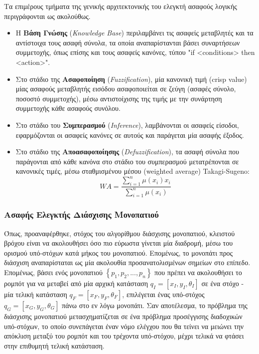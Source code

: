 \bigskip\noindent
Τα επιμέρους τμήματα της γενικής αρχιτεκτονικής του ελεγκτή ασαφούς λογικής περιγράφονται ως ακολούθως.
\begin{itemize}
	\item Η \textbf{Βάση Γνώσης} (\textit{Knowledge Base}) περιλαμβάνει τις ασαφείς μεταβλητές και τα αντίστοιχα τους ασαφή σύνολα, τα οποία αναπαρίστανται βάσει συναρτήσεων συμμετοχής, όπως επίσης και τους ασαφείς κανόνες, τύπου "if <conditions> then <action>".
	\item Στο στάδιο της \textbf{Aσαφοποίηση} (\textit{Fuzzification}), μία κανονική τιμή (crisp value) μίας ασαφούς μεταβλητής εισόδου ασαφοποιείται σε ζεύγη (ασαφές σύνολο, ποσοστό συμμετοχής), μέσω αντιστοίχισης της τιμής με την συνάρτηση συμμετοχής κάθε ασαφούς συνόλου.
	\item Στο στάδιο του \textbf{Συμπερασμού} (\textit{Inference}), λαμβάνονται οι ασαφείς είσοδοι, εφαρμόζονται οι ασαφείς κανόνες σε αυτούς και παράγεται μία ασαφής έξοδος.
	\item Στο στάδιο της \textbf{Αποασαφοποίησης} (\textit{Defuzzification}), τα ασαφή σύνολα που παράγονται από κάθε κανόνα στο στάδιο του συμπερασμού μετατρέπονται σε κανονικές τιμές, μέσω σταθμισμένου μέσου (weighted average) Takagi-Sugeno:
	\begin{equation}
		WA = \frac{\sum_{i=1}^n \mu(x_i)x_i}{\sum_{i=1}^n \mu(x_i)}
	\end{equation}
\end{itemize}

\subsubsection{Ασαφής Ελεγκτής Διάσχισης Μονοπατιού} \label{sssec:fuzzy_ptc}
Όπως, προαναφέρθηκε, στόχος του αλγορίθμου διάσχισης μονοπατιού, κλειστού βρόχου είναι να ακολουθήσει όσο πιο εύρωστα γίνεται μία διαδρομή, μέσω του ορισμού υπό-στόχων κατά μήκος του μονοπατιού. Επομένως, το μονοπάτι προς διάσχιση αναπαρίσταται ως μία ακολουθία προσανατολισμένων σημείων στο επίπεδο. Επομένως, βάσει ενός μονοπατιού $\left\{p_1, p_2, ..., p_n\right\}$ που πρέπει να ακολουθήσει το ρομπότ για να μεταβεί από μία αρχική κατάσταση $q_I=[x_I, y_I, \theta_I]$ σε ένα στόχο - μία τελική κατάσταση $q_F=[x_F, y_F, \theta_F]$, επιλέγεται ένας υπό-στόχος $q_G=[x_G, y_G, \theta_G]$ πάνω στο εν λόγω μονοπάτι. Σαν αποτέλεσμα, το πρόβλημα της διάσχισης μονοπατιού μετασχηματίζεται σε ένα πρόβλημα προσέγγισης διαδοχικών υπό-στόχων, το οποίο συνεπάγεται έναν νόμο ελέγχου που θα τείνει να μειώνει την απόκλιση μεταξύ του ρομπότ και του τρέχοντα υπό-στόχου, μέχρι τελικά να φτάσει στην επιθυμητή τελική κατάσταση.


